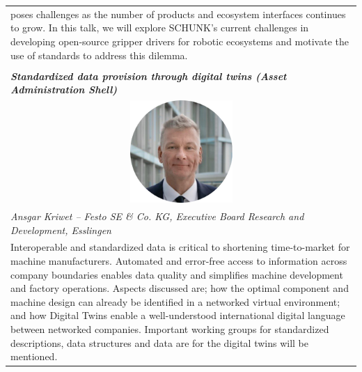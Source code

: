 \documentclass[
	openany, %
	parskip=full, %
	12pt, %
	a4paper, %
]{conferencebooklet} %
\begin{document}
\begin{multicols*}{2}
        
        \begin{tabular}{p{75mm}}
            poses challenges as the number of products and ecosystem interfaces continues to grow.
            In this talk, we will explore SCHUNK’s current challenges in developing open-source gripper drivers for robotic ecosystems and motivate the use of standards to address this dilemma. \\ \\
            
            \textit{\textbf{Standardized data provision through digital twins (Asset Administration Shell)}} \vspace{2mm} \\
            \multicolumn{1}{c}{ \includegraphics[width=0.3\textwidth]{standardization/ansgar-kriwet.png}} \vspace{2mm} \\
            \textit{Ansgar Kriwet -- Festo SE \& Co. KG, Executive Board Research and Development, Esslingen} \vspace{2mm} \\
            Interoperable and standardized data is critical to shortening time-to-market for machine manufacturers. 
            Automated and error-free access to information across company boundaries enables data quality and simplifies machine development and factory operations. Aspects discussed are; how the optimal component and machine design can already be identified in a networked virtual environment; and how Digital Twins enable a well-understood international digital language between networked companies. Important working groups for standardized descriptions, data structures and data are for the digital twins will be mentioned. 
        \end{tabular}
         
         
         
        

         
    \end{multicols*}

\end{document}
